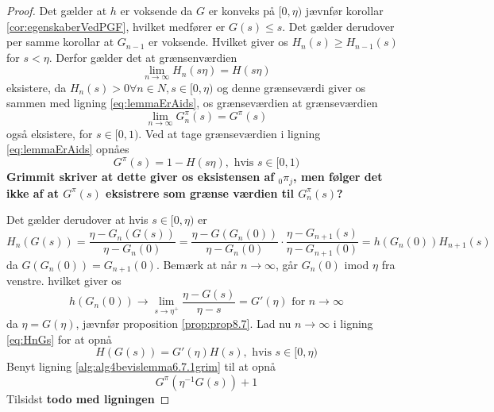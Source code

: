 \begin{proof}
Det gælder at $h$ er voksende da $G$ er konveks på $[0, \eta)$ jævnfør korollar \ref{cor:egenskaberVedPGF}, hvilket medfører er $G(s) \leq s$. Det gælder derudover per samme korollar at $G_{n - 1}$ er voksende. Hvilket giver os $H_n(s) \geq H_{n - 1}(s)$ for $s < \eta$. Derfor gælder det at grænsenværdien 
\begin{equation*}
    \lim_{n \to \infty} H_n(s\eta) = H(s\eta)
\end{equation*}
eksistere, da $H_n(s) > 0 \forall n \in N, s \in [0, \eta)$ og denne grænseværdi giver os sammen med ligning \eqref{eq:lemmaErAids}, os grænseværdien at grænseværdien
\begin{equation*}
    \lim_{n \to \infty} G_n^\pi(s) = G^\pi(s)
\end{equation*}
også eksistere, for $s \in [0, 1)$. Ved at tage grænseværdien i ligning \eqref{eq:lemmaErAids} opnåes
\begin{equation}\label{alg:alg4bevislemma6.7.1grim}
   G^\pi(s) = 1 - H(s \eta), \text{ hvis } s \in [0, 1) 
\end{equation}
\textbf{Grimmit skriver at dette giver os eksistensen af ${}_0\pi_j$, men følger det ikke af at $G^\pi(s)$ eksistrere som grænse værdien til $G^\pi_n(s)$?} 

Det gælder derudover at hvis $s \in [0, \eta)$ er 
\begin{equation*}\label{eq:HnGs}
    H_n(G(s)) = \frac{\eta - G_n(G(s))}{\eta - G_n(0)} = \frac{\eta - G(G_n(0))}{\eta - G_n(0)} \cdot \frac{\eta - G_{n + 1}(s)}{\eta - G_{n + 1}(0)} = h(G_n(0))H_{n + 1}(s)
\end{equation*}
da $G(G_n(0)) = G_{n + 1}(0)$.
Bemærk at når $n \to \infty$, går $G_n(0)$ imod $\eta$ fra venstre. hvilket giver os
\begin{equation*}
    h(G_n(0)) \to \lim_{s \to \eta^+} \frac{\eta - G(s)}{\eta - s} = G'(\eta) \text{ for } n \to \infty
\end{equation*}
da $\eta = G(\eta)$, jævnfør proposition \ref{prop:prop8.7}. Lad nu $n \to \infty$ i ligning \eqref{eq:HnGs} for at opnå
\begin{equation} \label{alg:alg6bevislemma6.7.1grim}
    H(G(s)) = G'(\eta)H(s), \text { hvis } s \in [0, \eta)
\end{equation}
Benyt ligning \eqref{alg:alg4bevislemma6.7.1grim} til at opnå
\begin{equation*}
    G^\pi(\eta^{-1}G(s)) + 1
\end{equation*}
Tilsidst \textbf{todo med ligningen}
\end{proof}


